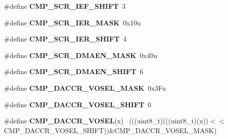 \begin{DoxyCompactItemize}
\item 
\hypertarget{group___c_m_p___register___masks_gaa9d242eac081d0d572e120ea3afa0e6f}{}\#define {\bfseries C\+M\+P\+\_\+\+S\+C\+R\+\_\+\+I\+E\+F\+\_\+\+S\+H\+I\+F\+T}~3\label{group___c_m_p___register___masks_gaa9d242eac081d0d572e120ea3afa0e6f}

\item 
\hypertarget{group___c_m_p___register___masks_ga2fbc99fb91c41e37b82ecabda7a9f0c7}{}\#define {\bfseries C\+M\+P\+\_\+\+S\+C\+R\+\_\+\+I\+E\+R\+\_\+\+M\+A\+S\+K}~0x10u\label{group___c_m_p___register___masks_ga2fbc99fb91c41e37b82ecabda7a9f0c7}

\item 
\hypertarget{group___c_m_p___register___masks_ga24fc92779af70d4d7fc87102c53b86ca}{}\#define {\bfseries C\+M\+P\+\_\+\+S\+C\+R\+\_\+\+I\+E\+R\+\_\+\+S\+H\+I\+F\+T}~4\label{group___c_m_p___register___masks_ga24fc92779af70d4d7fc87102c53b86ca}

\item 
\hypertarget{group___c_m_p___register___masks_ga217e649d3512ff1bba2c22885d768148}{}\#define {\bfseries C\+M\+P\+\_\+\+S\+C\+R\+\_\+\+D\+M\+A\+E\+N\+\_\+\+M\+A\+S\+K}~0x40u\label{group___c_m_p___register___masks_ga217e649d3512ff1bba2c22885d768148}

\item 
\hypertarget{group___c_m_p___register___masks_gafafda406631ad26c72187f4df02df484}{}\#define {\bfseries C\+M\+P\+\_\+\+S\+C\+R\+\_\+\+D\+M\+A\+E\+N\+\_\+\+S\+H\+I\+F\+T}~6\label{group___c_m_p___register___masks_gafafda406631ad26c72187f4df02df484}

\item 
\hypertarget{group___c_m_p___register___masks_gaf785bdf33cec5e0e8d03022bd7d92022}{}\#define {\bfseries C\+M\+P\+\_\+\+D\+A\+C\+C\+R\+\_\+\+V\+O\+S\+E\+L\+\_\+\+M\+A\+S\+K}~0x3\+Fu\label{group___c_m_p___register___masks_gaf785bdf33cec5e0e8d03022bd7d92022}

\item 
\hypertarget{group___c_m_p___register___masks_ga329adee42ffc5125d3a6a85c6b990311}{}\#define {\bfseries C\+M\+P\+\_\+\+D\+A\+C\+C\+R\+\_\+\+V\+O\+S\+E\+L\+\_\+\+S\+H\+I\+F\+T}~0\label{group___c_m_p___register___masks_ga329adee42ffc5125d3a6a85c6b990311}

\item 
\hypertarget{group___c_m_p___register___masks_ga7bc3c08fb7b5c8d02b7c1beac42323cb}{}\#define {\bfseries C\+M\+P\+\_\+\+D\+A\+C\+C\+R\+\_\+\+V\+O\+S\+E\+L}(x)                                          ~(((uint8\+\_\+t)(((uint8\+\_\+t)(x))$<$$<$C\+M\+P\+\_\+\+D\+A\+C\+C\+R\+\_\+\+V\+O\+S\+E\+L\+\_\+\+S\+H\+I\+F\+T))\&C\+M\+P\+\_\+\+D\+A\+C\+C\+R\+\_\+\+V\+O\+S\+E\+L\+\_\+\+M\+A\+S\+K)\label{group___c_m_p___register___masks_ga7bc3c08fb7b5c8d02b7c1beac42323cb}


\end{DoxyCompactItemize}
